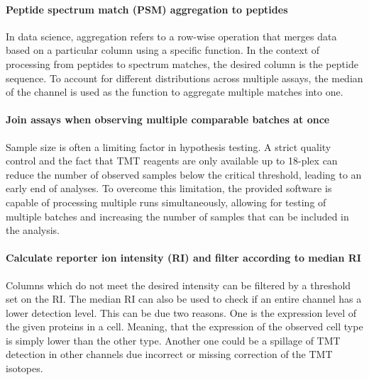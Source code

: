 \documentclass[
  11pt,
]{article}
\begin{document}
\hypertarget{peptide-spectrum-match-psm-aggregation-to-peptides}{%
\paragraph{Peptide spectrum match (PSM) aggregation to
peptides}\label{peptide-spectrum-match-psm-aggregation-to-peptides}}

In data science, aggregation refers to a row-wise operation that merges
data based on a particular column using a specific function. In the
context of processing from peptides to spectrum matches, the desired
column is the peptide sequence. To account for different distributions
across multiple assays, the median of the channel is used as the
function to aggregate multiple matches into one.

\hypertarget{join-assays-when-observing-multiple-comparable-batches-at-once}{%
\paragraph{Join assays when observing multiple comparable batches at
once}\label{join-assays-when-observing-multiple-comparable-batches-at-once}}

Sample size is often a limiting factor in hypothesis testing. A strict
quality control and the fact that TMT reagents are only available up to
18-plex can reduce the number of observed samples below the critical
threshold, leading to an early end of analyses. To overcome this
limitation, the provided software is capable of processing multiple runs
simultaneously, allowing for testing of multiple batches and increasing
the number of samples that can be included in the analysis.

\hypertarget{calculate-reporter-ion-intensity-ri-and-filter-according-to-median-ri}{%
\paragraph{Calculate reporter ion intensity (RI) and filter according to
median
RI}\label{calculate-reporter-ion-intensity-ri-and-filter-according-to-median-ri}}

Columns which do not meet the desired intensity can be filtered by a
threshold set on the RI. The median RI can also be used to check if an
entire channel has a lower detection level. This can be due two reasons.
One is the expression level of the given proteins in a cell. Meaning,
that the expression of the observed cell type is simply lower than the
other type. Another one could be a spillage of TMT detection in other
channels due incorrect or missing correction of the TMT isotopes.
\end{document}
